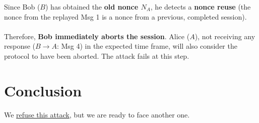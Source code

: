 \documentclass[11pt]{article}
\begin{document}
    Since Bob ($B$) has obtained the \textbf{old nonce $N_A$}, he detects a \textbf{nonce reuse} (the nonce from the replayed Msg 1 is a nonce from a previous, completed session).
    
    \paragraph{}
    Therefore, \textbf{Bob immediately aborts the session}. Alice ($A$), not receiving any response ($B \rightarrow A$: Msg 4) in the expected time frame, will also consider the protocol to have been aborted. The attack fails at this step.


    \section{Conclusion}
    We \underline{refuse this attack}, but we are ready to face another one.
\end{document}
